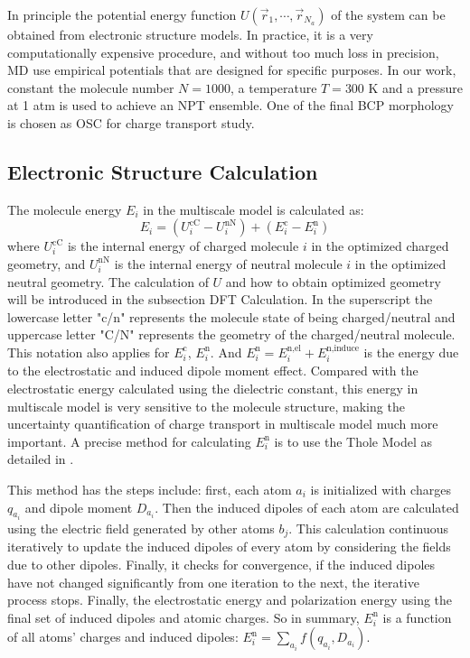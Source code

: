\documentclass[letterpaper,12pt]{article}
\begin{document}
In principle the potential energy function $U(\vec{r}_1,\cdots,\vec{r}_{N_a})$ of the system can be obtained from electronic structure models. In practice, it is a very computationally expensive procedure, and without too much loss in precision, MD use empirical potentials that are designed for specific purposes.
In our work, constant the molecule number $N=1000$, a temperature $T=300$ K and a pressure at 1 atm is used to achieve an NPT ensemble. 
One of the final BCP morphology is chosen as OSC for charge transport study. 

\subsection{Electronic Structure Calculation} 
The molecule energy $E_i$ in the multiscale model is calculated as:
\begin{equation}
E_i = (U^\text{cC}_i - U^\text{nN}_i) + (E^\text{c}_i - E^\text{n}_i)
\label{eq:E_i}
\end{equation}
where $U^\text{cC}_i$ is the internal energy of charged molecule $i$ in the optimized charged geometry, and $U^\text{nN}_i$ is the internal energy of neutral molecule $i$ in the optimized neutral geometry. The calculation of $U$ and how to obtain optimized geometry will be introduced in the subsection DFT Calculation.
In the superscript the lowercase letter "c/n" represents the molecule state of being charged/neutral and uppercase letter "C/N" represents the geometry of the charged/neutral molecule. This notation also applies for $E^\text{c}_i$, $E^\text{n}_i$. 
And $E^\text{n}_i = E^\text{n,el}_i + E^\text{n,induce}_i$ is the energy due to the electrostatic and induced dipole moment effect. Compared with the electrostatic energy calculated using the dielectric constant, this energy in multiscale model is very sensitive to the molecule structure, making the uncertainty quantification of charge transport in multiscale model much more important. 
A precise method for calculating $E^\text{n}_i$ is to use the Thole Model as detailed in \cite{Baumeier2011}.

This method has the steps include: first, each atom $a_i$ is initialized with charges $q_{a_i}$ and dipole moment $D_{a_i}$. 
Then the induced dipoles of each atom are calculated using the electric field generated by other atoms $b_j$.
This calculation continuous iteratively to update the induced dipoles of every atom by considering the fields due to other dipoles.
Finally, it checks for convergence, if the induced dipoles have not changed significantly from one iteration to the next, the iterative process stops.
Finally, the electrostatic energy and polarization energy using the final set of induced dipoles and atomic charges. So in summary, $E^\text{n}_i$ is a function of all atoms' charges and induced dipoles: $E^\text{n}_i = \sum\limits_{a_i} f(q_{a_i}, D_{a_i})$. 
\end{document}
